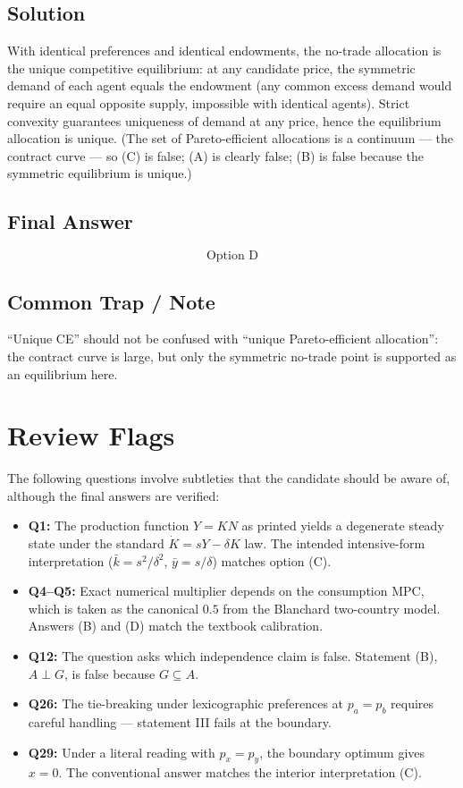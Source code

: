 \documentclass[11pt]{article}
\begin{document}
\subsection*{Solution}
With identical preferences and identical endowments, the no-trade allocation is the unique competitive equilibrium: at any candidate price, the symmetric demand of each agent equals the endowment (any common excess demand would require an equal opposite supply, impossible with identical agents). Strict convexity guarantees uniqueness of demand at any price, hence the equilibrium allocation is unique. (The set of Pareto-efficient allocations is a continuum --- the contract curve --- so (C) is false; (A) is clearly false; (B) is false because the symmetric equilibrium is unique.)

\subsection*{Final Answer}
\[
\boxed{\text{Option D}}
\]

\subsection*{Common Trap / Note}
``Unique CE'' should not be confused with ``unique Pareto-efficient allocation'': the contract curve is large, but only the symmetric no-trade point is supported as an equilibrium here.

\section*{Review Flags}

The following questions involve subtleties that the candidate should be aware of, although the final answers are verified:

\begin{itemize}[leftmargin=*]
\item \textbf{Q1:} The production function $Y=KN$ as printed yields a degenerate steady state under the standard $\dot K = sY - \delta K$ law. The intended intensive-form interpretation ($\bar k = s^2/\delta^2$, $\bar y = s/\delta$) matches option (C).
\item \textbf{Q4--Q5:} Exact numerical multiplier depends on the consumption MPC, which is taken as the canonical $0.5$ from the Blanchard two-country model. Answers (B) and (D) match the textbook calibration.
\item \textbf{Q12:} The question asks which independence claim is false. Statement (B), $A \perp G$, is false because $G \subseteq A$.
\item \textbf{Q26:} The tie-breaking under lexicographic preferences at $p_a = p_b$ requires careful handling --- statement III fails at the boundary.
\item \textbf{Q29:} Under a literal reading with $p_x = p_y$, the boundary optimum gives $x = 0$. The conventional answer matches the interior interpretation (C).
\end{itemize}
\end{document}
